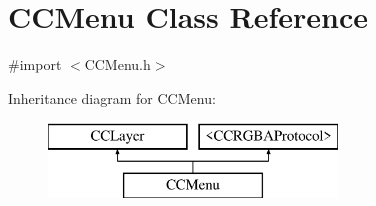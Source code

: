 \hypertarget{interface_c_c_menu}{\section{C\-C\-Menu Class Reference}
\label{interface_c_c_menu}
}


{\ttfamily \#import $<$C\-C\-Menu.\-h$>$}

Inheritance diagram for C\-C\-Menu\-:\begin{figure}[H]
\begin{center}
\leavevmode
\includegraphics[height=2.000000cm]{interface_c_c_menu}
\end{center}
\end{figure}
